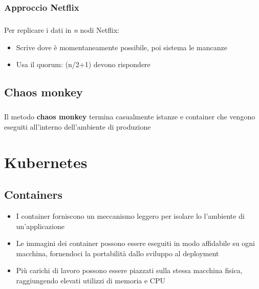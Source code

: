 \documentclass[a4paper, 12pt]{report}
\begin{document}
        \subsection{Approccio Netflix}
        \paragraph{}Per replicare i dati in \textit{n} nodi Netflix:
        \begin{itemize}
          \item Scrive dove è momentaneamente possibile, poi sistema le mancanze
          \item Usa il quorum: (n/2+1) devono rispondere
        \end{itemize}
        \section{Chaos monkey}
        \paragraph{}Il metodo \textbf{chaos monkey} termina casualmente istanze e container che vengono eseguiti all'interno dell'ambiente di produzione
      \chapter{Kubernetes}
        \section{Containers}
        \begin{itemize}
          \item I container forniscono un meccanismo leggero per isolare lo l'ambiente di un'applicazione
          \item Le immagini dei container possono essere eseguiti in modo affidabile su ogni macchina, fornendoci la portabilità dallo sviluppo al deployment
          \item Più carichi di lavoro possono essere piazzati sulla stessa macchina fisica, raggiungendo elevati utilizzi di memoria e CPU
        \end{itemize}
\end{document}
